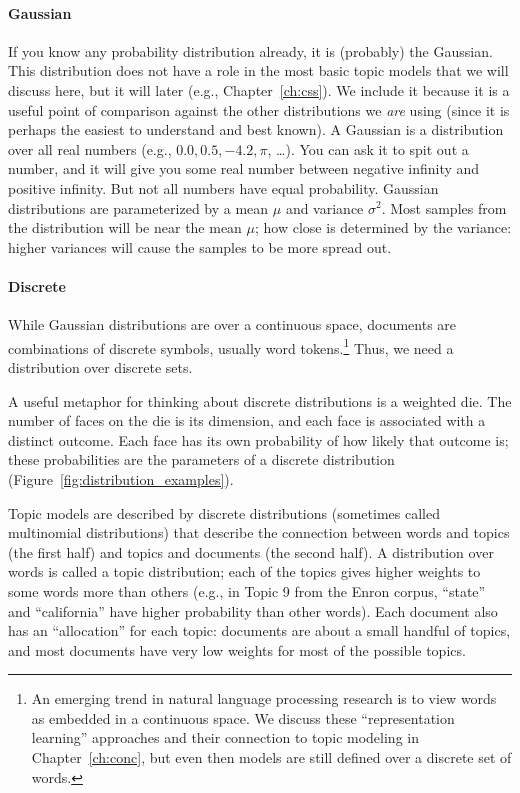 \paragraph{Gaussian} If you know any probability distribution already,
it is (probably) the
Gaussian.  This distribution does not have a role in the most basic topic models that we will
discuss here, but it will later (e.g., Chapter~\ref{ch:css}).  We
include it because it is a useful point of comparison against the other
distributions we {\em are} using (since it is perhaps the easiest to understand and best
known). A Gaussian is a distribution over all real numbers (e.g., $0.0, 0.5,
-4.2, \pi$, \dots).  You can ask it to spit out a number, and it will give you
some real number between negative infinity and positive infinity.  But not all
numbers have equal probability.  Gaussian distributions are parameterized by a
mean $\mu$ and variance $\sigma^2$.  Most samples from the distribution will be
near the mean $\mu$; how close is determined by the variance: higher variances
will cause the samples to be more spread out.

\paragraph{Discrete}

While Gaussian distributions are over a continuous space, documents are
combinations of discrete symbols, usually word tokens.\footnote{An emerging trend in natural language
  processing research is to view words as embedded in a continuous space. We
  discuss these ``representation learning'' approaches and their connection to
  topic modeling in Chapter~\ref{ch:conc}, but even then models are still defined over a discrete set of words.}   Thus, we need a distribution
over discrete sets.

A useful metaphor for thinking about discrete distributions is a weighted die.
The number of faces on the die is its dimension, and each face is associated with a distinct
outcome.  Each face has its own probability of how likely that outcome is;
these probabilities are the parameters of a discrete distribution
(Figure~\ref{fig:distribution_examples}).

Topic models are described by discrete distributions (sometimes called
multinomial distributions) that describe the connection between words and topics (the first half) and topics and documents (the second half).  A distribution
over words is called a topic distribution; each of the topics gives
higher weights to some words more than others (e.g., in Topic 9 from
the Enron corpus, ``state'' and ``california'' have higher probability
than other words).  Each document also has an ``allocation'' for each
topic: documents are about a small handful of topics, and most
documents have very low weights for most of the possible topics.

